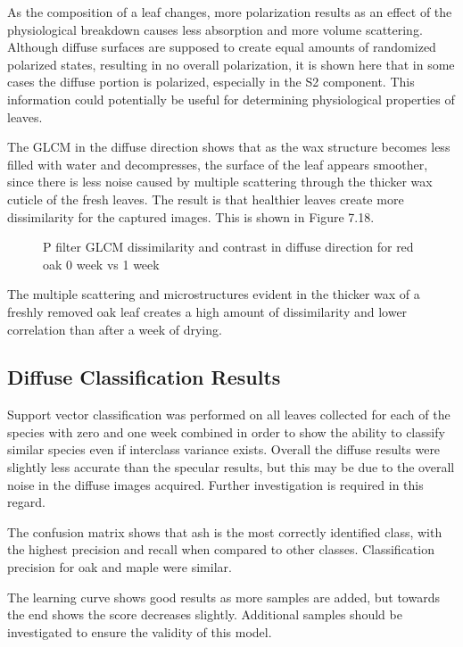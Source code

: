 As the composition of a leaf changes, more polarization results as an effect of the physiological breakdown causes less absorption and more volume scattering.  Although diffuse surfaces are supposed to create equal amounts of randomized polarized states, resulting in no overall polarization, it is shown here that in some cases the diffuse portion is polarized, especially in the S2 component.  This information could potentially be useful for determining physiological properties of leaves.

The GLCM in the diffuse direction shows that as the wax structure becomes less filled with water and decompresses, the surface of the leaf appears smoother, since there is less noise caused by multiple scattering through the thicker wax cuticle of the fresh leaves.  The result is that healthier leaves create more dissimilarity for the captured images.  This is shown in Figure 7.18.
%
\begin{figure}[!htb]
    \begin{center}
    \end{center}
    \caption{P filter GLCM dissimilarity and contrast in diffuse direction for red oak 0 week vs 1 week}
    \label{fig:polarization}
\end{figure}
%
The multiple scattering and microstructures evident in the thicker wax of a freshly removed oak leaf creates a high amount of dissimilarity and lower correlation than after a week of drying.

\subsection{Diffuse Classification Results}
Support vector classification was performed on all leaves collected for each of the species with zero and one week combined in order to show the ability to classify similar species even if interclass variance exists.  Overall the diffuse results were slightly less accurate than the specular results, but this may be due to the overall noise in the diffuse images acquired.  Further investigation is required in this regard.

The confusion matrix shows that ash is the most correctly identified class, with the highest precision and recall when compared to other classes.  Classification precision for oak and maple were similar.

The learning curve shows good results as more samples are added, but towards the end shows the score decreases slightly.  Additional samples should be investigated to ensure the validity of this model.

